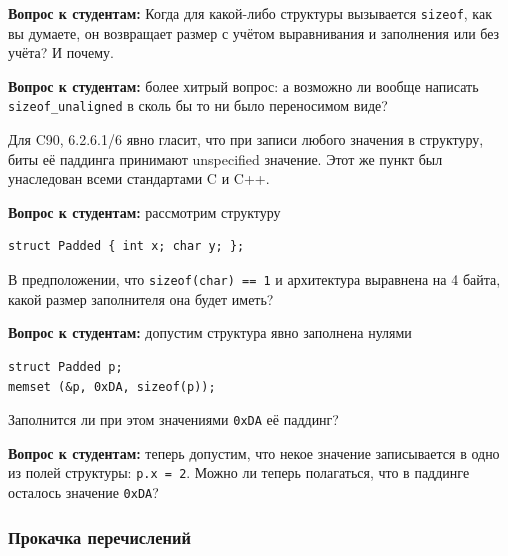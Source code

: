 \documentclass[a4paper,12pt,oneside]{article}
\newif\ifanswers
\begin{document}
\textbf{Вопрос к студентам:} Когда для какой-либо структуры вызывается \lstinline!sizeof!, как вы думаете, он возвращает размер с учётом выравнивания и заполнения или без учёта? И почему.

\ifanswers
Правильный ответ: с учётом. Потому что иначе например не работала бы идиома \lstinline!malloc (sizeof(widget))! -- здесь выделялось бы динамической памяти меньше, чем реально нужно.
\fi

\textbf{Вопрос к студентам:} более хитрый вопрос: а возможно ли вообще написать \lstinline!sizeof_unaligned! в сколь бы то ни было переносимом виде?

\ifanswers
Правильный ответ автору неизвестен. Скорее всего нет, но никто не исключает наличие какого-нибудь особо хитрого трюка.
\fi

Для C90, 6.2.6.1/6 явно гласит, что при записи любого значения в структуру, биты её паддинга принимают unspecified значение. Этот же пункт был унаследован всеми стандартами C и C++.

\textbf{Вопрос к студентам:} рассмотрим структуру

\begin{lstlisting}
struct Padded { int x; char y; };
\end{lstlisting}

В предположении, что \lstinline!sizeof(char) == 1! и архитектура выравнена на 4 байта, какой размер заполнителя она будет иметь?

\ifanswers
Правильный ответ: 3 байта.
\fi

\textbf{Вопрос к студентам:} допустим структура явно заполнена нулями

\begin{lstlisting}
struct Padded p;
memset (&p, 0xDA, sizeof(p));
\end{lstlisting}

Заполнится ли при этом значениями \lstinline!0xDA! её паддинг?

\ifanswers
Верный ответ: да, несомненно.
\fi

\textbf{Вопрос к студентам:} теперь допустим, что некое значение записывается в одно из полей структуры: \lstinline!p.x = 2!. Можно ли теперь полагаться, что в паддинге осталось значение \lstinline!0xDA!?

\ifanswers
Верный ответ: нет, потому что см. выше, при записи в поля, паддинг unspecified.
\fi

\subsubsection{Прокачка перечислений}\label{EnumClass}
\end{document}

